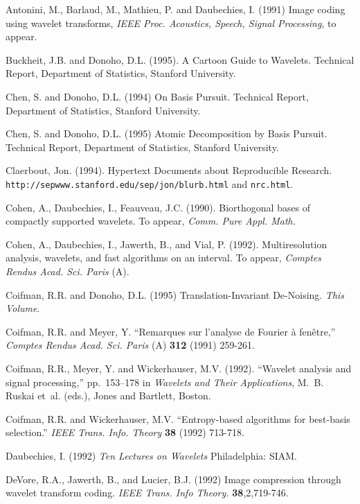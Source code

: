 
\begin{thebibliography}{99}

Antonini, M., Barlaud, M., Mathieu, P. and Daubechies, I. (1991)
Image coding using wavelet transforms,
{\it IEEE Proc. Acoustics, Speech, Signal Processing}, to appear.

Buckheit, J.B. and Donoho, D.L. (1995).  A Cartoon Guide to Wavelets.
Technical Report, Department of Statistics, Stanford University.

Chen, S. and Donoho, D.L. (1994) On Basis Pursuit.
Technical Report, Department of Statistics,
Stanford University.

Chen, S. and Donoho, D.L. (1995) Atomic Decomposition by Basis Pursuit.
Technical Report, Department of Statistics,
Stanford University.

Claerbout, Jon. (1994).  Hypertext Documents about Reproducible Research.
{\tt http://sepwww.stanford.edu/sep/jon/blurb.html} and {\tt nrc.html}.

Cohen, A., Daubechies, I., Feauveau, J.C. (1990).
Biorthogonal bases of compactly supported wavelets.  
To appear, {\it Comm. Pure Appl. Math.}

Cohen, A., Daubechies, I., Jawerth, B., and Vial, P. (1992).
Multiresolution analysis, wavelets, and fast algorithms on an
interval.  To appear, {\it Comptes Rendus Acad. Sci. Paris} (A).

Coifman, R.R. and Donoho, D.L. (1995)
Translation-Invariant De-Noising.
{\it This Volume}.

Coifman, R.R. and Meyer, Y.
``Remarques sur l'analyse de Fourier \`{a} fen\^{e}tre,''
{\it Comptes Rendus Acad. Sci. Paris} (A) {\bf 312} (1991) 259-261.

Coifman, R.R., Meyer, Y. and Wickerhauser, M.V. (1992).
``Wavelet analysis and signal processing,''
pp.~153--178 in {\em Wavelets and Their Applications},
M.~B. Ruskai et~al. (eds.), Jones and Bartlett, Boston.

Coifman, R.R. and Wickerhauser, M.V.
``Entropy-based algorithms for best-basis selection.''
{\it IEEE Trans. Info. Theory} {\bf 38} (1992) 713-718.

Daubechies, I. (1992)
{\it Ten Lectures on Wavelets}
Philadelphia: SIAM.

DeVore, R.A., Jawerth, B., and Lucier, B.J. (1992)
Image compression through wavelet transform coding.
{\it IEEE Trans. Info Theory.} {\bf 38},2,719-746. 


\end{thebibliography}
